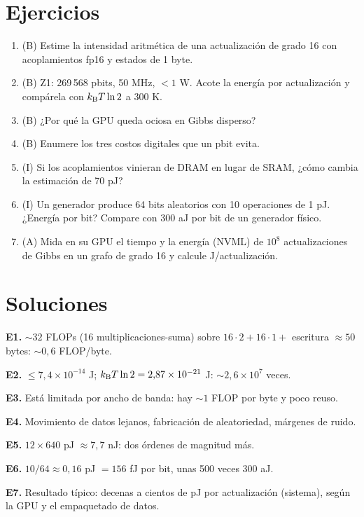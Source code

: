 \documentclass[11pt,a4paper]{article}
\begin{document}
\section{Ejercicios}
\begin{enumerate}[label=\textbf{E\arabic*.}]
\item (B) Estime la intensidad aritmética de una actualización de grado 16 con acoplamientos fp16 y estados de 1 byte.
\item (B) Z1: 269\,568 pbits, 50 MHz, $<1$ W. Acote la energía por actualización y compárela con $k_{\mathrm B} T\ln2$ a 300 K.
\item (B) ¿Por qué la GPU queda ociosa en Gibbs disperso?
\item (B) Enumere los tres costos digitales que un pbit evita.
\item (I) Si los acoplamientos vinieran de DRAM en lugar de SRAM, ¿cómo cambia la estimación de 70 pJ?
\item (I) Un generador produce 64 bits aleatorios con 10 operaciones de 1 pJ. ¿Energía por bit? Compare con 300 aJ por bit de un generador físico.
\item (A) Mida en su GPU el tiempo y la energía (NVML) de $10^8$ actualizaciones de Gibbs en un grafo de grado 16 y calcule J/actualización.
\end{enumerate}
\section{Soluciones}
\begin{solucion}
\textbf{E1.} $\sim32$ FLOPs (16 multiplicaciones-suma) sobre $16\cdot2+16\cdot1+$ escritura $\approx50$ bytes: $\sim0{,}6$ FLOP/byte.

\textbf{E2.} $\le7{,}4\times10^{-14}$ J; $k_{\mathrm B} T\ln2=2{,}87\times10^{-21}$ J: $\sim2{,}6\times10^7$ veces.

\textbf{E3.} Está limitada por ancho de banda: hay $\sim1$ FLOP por byte y poco reuso.

\textbf{E4.} Movimiento de datos lejanos, fabricación de aleatoriedad, márgenes de ruido.

\textbf{E5.} $12\times640$ pJ $\approx7{,}7$ nJ: dos órdenes de magnitud más.

\textbf{E6.} $10/64\approx0{,}16$ pJ $=156$ fJ por bit, unas 500 veces 300 aJ.

\textbf{E7.} Resultado típico: decenas a cientos de pJ por actualización (sistema), según la GPU y el empaquetado de datos.
\end{solucion}
\end{document}

